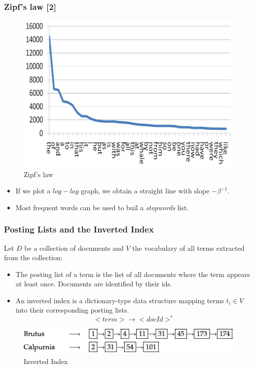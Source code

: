 \documentclass[handout]{beamer}
\begin{document}
\begin{frame}\frametitle{Zipf's law [2]}
\footnotesize{

\begin{figure}[h!]
	\centering
	\includegraphics[scale=0.5]{pics/zipf1.png}
	\caption{Zipf's law}
\end{figure}
\begin{itemize}
 \item If we plot a $log-log$ graph, we obtain a straight line with slope  $-\beta^{-1}$.
 \item Most frequent words can be used to buil a \emph{stopwords} list. 
\end{itemize}
}



 
\end{frame}

\begin{frame}\frametitle{Posting Lists and the Inverted Index}
{\footnotesize Let $D$ be a collection of documents  and $V$ the vocabulary of all terms extracted from the collection:

\begin{itemize}
 \item The posting list of a term is the list of all documents where the term appears at least once. Documents are identified by their ids.
 \item An inverted index is a dictionary-type data structure mapping terms $t_{i} \in V$ into their corresponding posting lists.  
 \begin{displaymath}
  <term> \rightarrow <docId>^*
 \end{displaymath}

\end{itemize}

\begin{figure}[h!]
	\centering
	\includegraphics[scale=0.6]{pics/invFile.png}
	\caption{Inverted Index}
\end{figure}



}
\end{frame}
\end{document}
